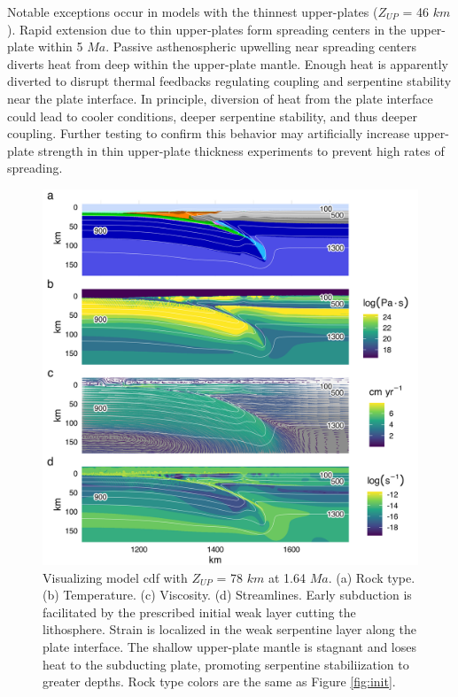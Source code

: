 Notable exceptions occur in models with the thinnest upper-plates (\(Z_{UP}\) = 46 \(km\)). Rapid extension due to thin upper-plates form spreading centers in the upper-plate within 5 \(Ma\). Passive asthenospheric upwelling near spreading centers diverts heat from deep within the upper-plate mantle. Enough heat is apparently diverted to disrupt thermal feedbacks regulating coupling and serpentine stability near the plate interface. In principle, diversion of heat from the plate interface could lead to cooler conditions, deeper serpentine stability, and thus deeper coupling. Further testing to confirm this behavior may artificially increase upper-plate strength in thin upper-plate thickness experiments to prevent high rates of spreading.

\begin{figure}[htbp]

{\centering \includegraphics[width=1\linewidth,]{assets/figs/chpt2/figA2} 

}

\caption[Results for model cdf with $Z_{UP}$ = 78 $km$ at 1.64 $Ma$]{Visualizing model cdf with $Z_{UP}$ = 78 $km$ at 1.64 $Ma$. (a) Rock type. (b) Temperature. (c) Viscosity. (d) Streamlines. Early subduction is facilitated by the prescribed initial weak layer cutting the lithosphere. Strain is localized in the weak serpentine layer along the plate interface. The shallow upper-plate mantle is stagnant and loses heat to the subducting plate, promoting serpentine stabiliization to greater depths. Rock type colors are the same as Figure \ref{fig:init}.}\label{fig:cdfStep1}
\end{figure}

